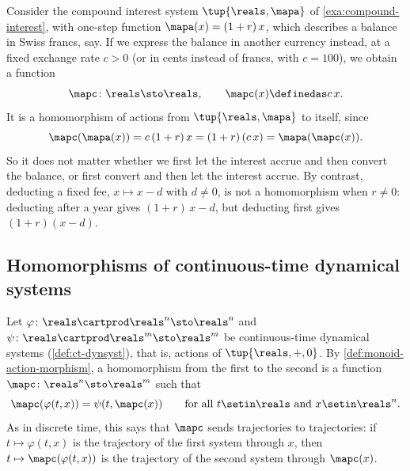 \begin{example}
    \label{exa:compound-interest-currency}
    Consider the compound interest system $\tup{\reals, \mapa}$ of \cref{exa:compound-interest}, with one-step function $\mapa(x) = (1 + r)\,x$, which describes a balance in Swiss francs, say.
    If we express the balance in another currency instead, at a fixed exchange rate $c > 0$ (or in cents instead of francs, with $c = 100$), we obtain a function
    \begin{equation}
        \mapc \colon \reals \sto \reals, \qquad \mapc(x) \definedas c\,x.
    \end{equation}
    It is a homomorphism of actions from $\tup{\reals, \mapa}$ to itself, since
    \begin{equation}
        \mapc(\mapa(x)) = c\,(1 + r)\,x = (1 + r)\,(c\,x) = \mapa(\mapc(x)).
    \end{equation}
    So it does not matter whether we first let the interest accrue and then convert the balance, or first convert and then let the interest accrue.
    By contrast, deducting a fixed fee, $x \mapsto x - d$ with $d \neq 0$, is not a homomorphism when $r \neq 0$: deducting after a year gives $(1 + r)\,x - d$, but deducting first gives $(1 + r)(x - d)$.
\end{example}

\subsection{Homomorphisms of continuous-time dynamical systems}
\label{sec:homomorphisms-continuous-time}

Let $\varphi \colon \reals \cartprod \reals^n \sto \reals^n$ and $\psi \colon \reals \cartprod \reals^m \sto \reals^m$ be continuous-time dynamical systems (\cref{def:ct-dynsyst}), that is, actions of $\tup{\reals, +, 0}$.
By \cref{def:monoid-action-morphism}, a homomorphism from the first to the second is a function $\mapc \colon \reals^n \sto \reals^m$ such that
\begin{equation}
    \label{eq:equivariance-continuous-time}
    \mapc(\varphi(t, x)) = \psi(t, \mapc(x)) \qquad \text{for all } t \setin \reals \text{ and } x \setin \reals^n.
\end{equation}
As in discrete time, this says that $\mapc$ sends trajectories to trajectories: if $t \mapsto \varphi(t, x)$ is the trajectory of the first system through $x$, then $t \mapsto \mapc(\varphi(t, x))$ is the trajectory of the second system through $\mapc(x)$.

